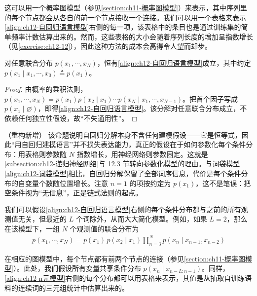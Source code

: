\documentclass[../../main.tex]{subfiles}
\begin{document}
这可以用一个概率图模型（参见\cref{section:ch11-概率图模型}）来表示，其中序列里的每个节点都会从各自的前一个节点接收一个连接。我们可以用一个表格来表示\eqref{align:ch12-自回归语言模型}右侧的每一项，该表格中的条目也是通过训练集的简单频率计数估算出来的。然而，这些表格的大小会随着序列长度的增加呈指数增长（见\cref{exercise:ch12-12}），因此这种方法的成本会高得令人望而却步。

\begin{proposition}[自回归分解]\label{proposition:ch12-自回归分解}
对任意联合分布 $p(x_1,\cdots,x_N)$，恒有\eqref{align:ch12-自回归语言模型}成立，其中约定 $p(x_1\mid x_1,\cdots,x_0)\triangleq p(x_1)$。
\end{proposition}

\begin{proof}
由概率的乘积法则，$p(x_1,\cdots,x_N)=p(x_1)p(x_2\mid x_1)\cdots p(x_N\mid x_1,\cdots,x_{N-1})$。把首个因子写成 $p(x_1\mid\varnothing)$，即得\eqref{align:ch12-自回归语言模型}。该分解对任意联合分布成立，不依赖任何独立性假设，故“不失通用性”。
\end{proof}

\begin{remark}（重构新增）
该命题说明自回归分解本身不含任何建模假设——它是恒等式，因此“用自回归建模语言”并不损失表达能力，真正的假设在于如何参数化每个条件分布：用表格则参数随 $N$ 指数增长，用神经网络则参数固定。这就是\cref{subsection:ch12-递归神经网络}与 12.3 节转向参数化模型的理由。与词袋模型\eqref{align:ch12-词袋模型}相比，自回归分解保留了全部词序信息，代价是每个条件分布的自变量个数随位置增长。注意 $n=1$ 的项按约定为 $p(x_1)$，这不是笔误：把空条件视为“无信息”，正是链式法则的起点。
\end{remark}

我们可以假设\eqref{align:ch12-自回归语言模型}右侧的每个条件分布都与之前的所有观测值无关，但最近的 $L$ 个词除外，从而大大简化模型。例如，如果 $L=2$，那么在该模型下，一组 $N$ 个观测值的联合分布为
\begin{align}
p(x_1,\cdots,x_N)=p(x_1)\,p(x_2\mid x_1)\prod_{n=3}^{N}p(x_n\mid x_{n-1},x_{n-2})
\label{align:ch12-n元模型}
\end{align}

在相应的图模型中，每个节点都有前两个节点的连接（参见\cref{section:ch11-概率图模型}）。此处，我们假设所有变量共享条件分布 $p(x_n\mid x_{n-L:n-1})$。同样，\eqref{align:ch12-n元模型}右侧的每个分布都可以用表格来表示，其值是从抽取自训练语料的连续词的三元组统计中估算出来的。
\end{document}
